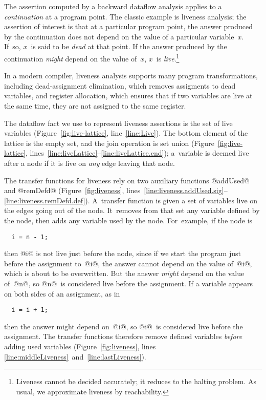 \documentclass[blockstyle,preprint,natbib,nocopyrightspace]{sigplanconf}
\newcommand\lineref[1]{line~\ref{line:#1}}
\newcommand\linepairref[2]{lines \ref{line:#1}~and~\ref{line:#2}}
\newcommand\linerangeref[2]{\mbox{lines~\ref{line:#1}--\ref{line:#2}}}
\newcommand\seclabel[1]{\label{sec:#1}}
\newcommand\figref[1]{Figure~\ref{fig:#1}}
\begin{document}
\seclabel{liveness}

The assertion computed by 
a backward dataflow analysis applies to a
\emph{continuation} at a program point.
The classic example is liveness analysis;
the assertion of interest is that at a particular program point,
the answer produced by the continuation does not depend on
the value of a particular variable~$x$.
If~so, $x$~is said to be \emph{dead} at that point.
If the answer produced by the continuation \emph{might} depend on the
value of~$x$, $x$~is \emph{live}.\footnote
{Liveness cannot be decided accurately; it reduces to the halting problem.
As usual, we approximate liveness by reachability.}

In a modern compiler, liveness analysis supports many program
transformations,
including
dead-assignment elimination,
which removes assigments to dead variables, 
and register allocation, which
ensures that if two variables are 
live at the same time, they are not assigned to the same register. 

The dataflow fact we use to represent liveness assertions is the set of
live variables (\figref{live-lattice}, \lineref{Live}).
The bottom element of the lattice is the empty set, and the join
operation is set union (\figref{live-lattice},
\linerangeref{liveLattice}{liveLattice.end}); 
a~variable is deemed live after a node if it is live on \emph{any} edge leaving that
node.

The transfer functions for liveness rely on two auxiliary functions
@addUsed@ and @remDefd@ (\figref{liveness}, 
\linerangeref{liveness.addUsed.sig}{liveness.remDefd.def}).
A~transfer function is given a set of variables live on the edges
going out of the node.
It~removes from that set any variable
defined by the node, then adds any variable used by the
node.
For~example, if the node is
\begin{verbatim}
  i = n - 1;
\end{verbatim}
then @i@ is not live just before the node, since if we start the
program just before the assignment to~@i@, the answer cannot 
depend on the value of~@i@, which is about to be overwritten.
But the answer \emph{might} depend on the value of~@n@, so
@n@~is considered live before the assignment.
If a variable appears on both sides of an
assignment, as in \ifpagetuning{\looseness=-1 \par}\fi
\begin{verbatim}
  i = i + 1;
\end{verbatim}
then the answer might depend on~@i@, so @i@~is considered live
before the assignment.
The transfer functions
therefore
remove defined variables \emph{before} adding used variables
(\figref{liveness}, \linepairref{middleLiveness}{lastLiveness}). 
\end{document}
